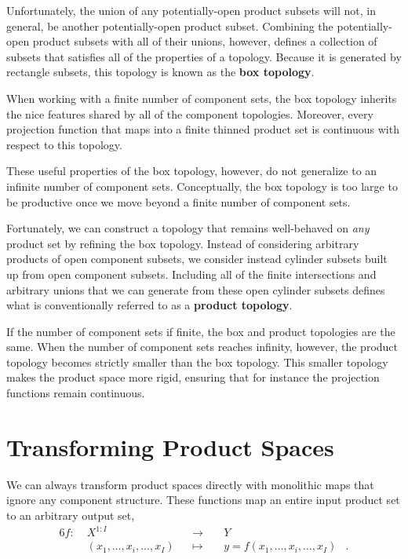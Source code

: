 \documentclass[
  letterpaper,
  DIV=11,
  numbers=noendperiod]{scrartcl}
\begin{document}
Unfortunately, the union of any potentially-open product subsets will
not, in general, be another potentially-open product subset. Combining
the potentially-open product subsets with all of their unions, however,
defines a collection of subsets that satisfies all of the properties of
a topology. Because it is generated by rectangle subsets, this topology
is known as the \textbf{box topology}.

When working with a finite number of component sets, the box topology
inherits the nice features shared by all of the component topologies.
Moreover, every projection function that maps into a finite thinned
product set is continuous with respect to this topology.

These useful properties of the box topology, however, do not generalize
to an infinite number of component sets. Conceptually, the box topology
is too large to be productive once we move beyond a finite number of
component sets.

Fortunately, we can construct a topology that remains well-behaved on
\emph{any} product set by refining the box topology. Instead of
considering arbitrary products of open component subsets, we consider
instead cylinder subsets built up from open component subsets. Including
all of the finite intersections and arbitrary unions that we can
generate from these open cylinder subsets defines what is conventionally
referred to as a \textbf{product topology}.

If the number of component sets if finite, the box and product
topologies are the same. When the number of component sets reaches
infinity, however, the product topology becomes strictly smaller than
the box topology. This smaller topology makes the product space more
rigid, ensuring that for instance the projection functions remain
continuous.

\section{Transforming Product Spaces}\label{transforming-product-spaces}

We can always transform product spaces directly with monolithic maps
that ignore any component structure. These functions map an entire input
product set to an arbitrary output set, \begin{alignat*}{6}
f :\; & X^{1:I} & &\rightarrow& \; & Y &
\\
& (x_{1}, \ldots, x_{i}, \ldots, x_{I}) & &\mapsto&
& y = f(x_{1}, \ldots, x_{i}, \ldots, x_{I}) &.
\end{alignat*}
\end{document}
